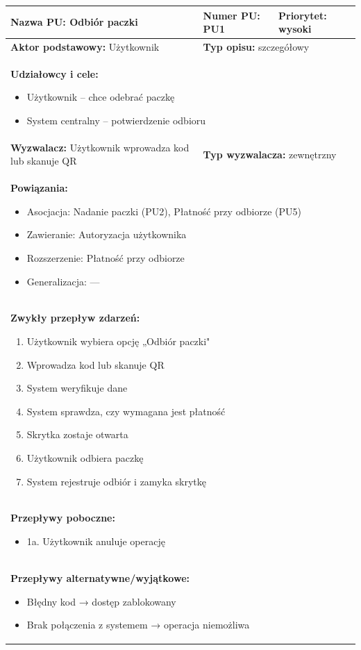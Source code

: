 \documentclass[a4paper,12pt]{article}
\begin{document}
\begin{tabular}{|p{6cm}|p{4cm}|p{5cm}|}
\hline
\textbf{Nazwa PU:} Odbiór paczki &
\textbf{Numer PU:} PU1 &
\textbf{Priorytet:} wysoki \\
\hline
\textbf{Aktor podstawowy:} Użytkownik &
\multicolumn{2}{p{9cm}|}{\textbf{Typ opisu:} szczegółowy} \\
\hline
\multicolumn{3}{|p{15cm}|}{
\textbf{Udziałowcy i cele:}
\begin{itemize}
\item Użytkownik – chce odebrać paczkę
\item System centralny – potwierdzenie odbioru
\end{itemize}
} \\
\hline
\textbf{Wyzwalacz:} Użytkownik wprowadza kod lub skanuje QR &
\multicolumn{2}{p{9cm}|}{\textbf{Typ wyzwalacza:} zewnętrzny} \\
\hline
\multicolumn{3}{|p{15cm}|}{
\textbf{Powiązania:}
\begin{itemize}
\item Asocjacja: Nadanie paczki (PU2), Płatność przy odbiorze (PU5)
\item Zawieranie: Autoryzacja użytkownika
\item Rozszerzenie: Płatność przy odbiorze
\item Generalizacja: —
\end{itemize}
} \\
\hline
\multicolumn{3}{|p{15cm}|}{
\textbf{Zwykły przepływ zdarzeń:}
\begin{enumerate}
\item Użytkownik wybiera opcję „Odbiór paczki"
\item Wprowadza kod lub skanuje QR
\item System weryfikuje dane
\item System sprawdza, czy wymagana jest płatność
\item Skrytka zostaje otwarta
\item Użytkownik odbiera paczkę
\item System rejestruje odbiór i zamyka skrytkę
\end{enumerate}
} \\
\hline
\multicolumn{3}{|p{15cm}|}{
\textbf{Przepływy poboczne:}
\begin{itemize}
\item 1a. Użytkownik anuluje operację
\end{itemize}
} \\
\hline
\multicolumn{3}{|p{15cm}|}{
\textbf{Przepływy alternatywne/wyjątkowe:}
\begin{itemize}
\item Błędny kod → dostęp zablokowany
\item Brak połączenia z systemem → operacja niemożliwa
\end{itemize}
} \\
\hline
\end{tabular}
\end{document}
